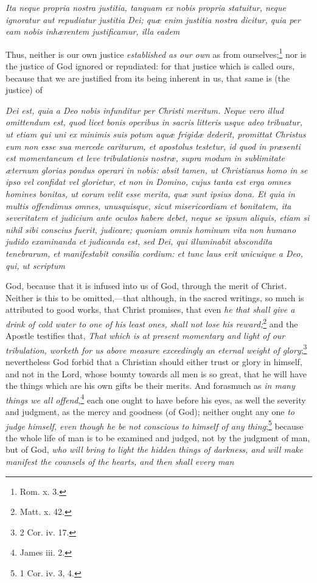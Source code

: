 \emph{Ita neque propria nostra justitia, tanquam ex nobis propria statuitur, neque ignoratur aut repudiatur justitia Dei; quæ enim justitia nostra dicitur, quia per eam nobis inhærentem justificamur, illa eadem }

Thus, neither is our own justice \emph{established as our own} as from ourselves;\footnote{\par   Rom. x. 3.} nor is the justice of God ignored or repudiated: for that justice which is called ours, because that we are justified from its being inherent in us, that same is (the justice) of

\emph{Dei est, quia a Deo nobis infunditur per Christi meritum. Neque vero illud omittendum est, quod licet bonis operibus in sacris litteris usque adeo tribuatur, ut etiam qui uni ex minimis suis potum aquæ frigidæ dederit, promittat Christus eum non esse sua mercede cariturum, et apostolus testetur, id quod in præsenti est momentaneum et leve tribulationis nostræ, supra modum in sublimitate æternum glorias pondus operari in nobis: absit tamen, ut Christianus homo in se ipso vel confidat vel glorietur, et non in Domino, cujus tanta est erga omnes homines bonitas, ut eorum velit esse merita, quæ sunt ipsius dona. Et quia in multis offendimus omnes, unusquisque, sicut misericordiam et bonitatem, ita severitatem et judicium ante oculos habere debet, neque se ipsum aliquis, etiam si nihil sibi conscius fuerit, judicare; quoniam omnis hominum vita non humano judido examinanda et judicanda est, sed Dei, qui illuminabit abscondita tenebrarum, et manifestabit consilia cordium: et tunc laus erit unicuique a Deo, qui, ut scriptum }

God, because that it is infused into us of God, through the merit of Christ. Neither is this to be omitted,—that although, in the sacred writings, so much is attributed to good works, that Christ promises, that even \emph{he that shall give a drink of cold water to one of his least ones, shall not lose his reward;}\footnote{\par   Matt. x. 42.}\emph{ }and the Apostle testifies that, \emph{That which is at present momentary and light of our tribulation, worketh for us above measure exceedingly an eternal weight of glory};\footnote{\par   2 Cor. iv. 17.} nevertheless God forbid that a Christian should either trust or glory in himself, and not in the Lord, whose bounty towards all men is so great, that he will have the things which are his own gifts be their merits. And forasmuch as \emph{in many things we all offend},\footnote{\par   James iii. 2.} each one ought to have before his eyes, as well the severity and judgment, as the mercy and goodness (of God); neither ought any one \emph{to judge himself, even though he be not conscious to himself of any thing};\footnote{\par   1 Cor. iv. 3, 4.} because the whole life of man is to be examined and judged, not by the judgment of man, but of God, \emph{who will bring to light the hidden things of darkness, and will make manifest the counsels of the hearts, and then shall every man}

